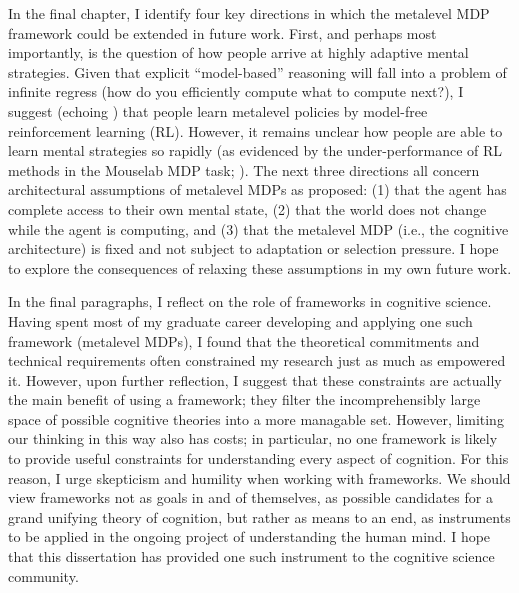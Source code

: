 \documentclass[11pt,a4paperpaper,]{article}
\begin{document}
In the final chapter, I identify four key directions in which the metalevel MDP framework could be extended in future work. First, and perhaps most importantly, is the question of how people arrive at highly adaptive mental strategies. Given that explicit ``model-based'' reasoning will fall into a problem of infinite regress (how do you efficiently compute what to compute next?), I suggest (echoing \citealp{lieder2017strategy}) that people learn metalevel policies by model-free reinforcement learning (RL). However, it remains unclear how people are able to learn mental strategies so rapidly (as evidenced by the under-performance of RL methods in the Mouselab MDP task; \citealp{jain2019how}). The next three directions all concern architectural assumptions of metalevel MDPs as proposed: (1) that the agent has complete access to their own mental state, (2) that the world does not change while the agent is computing, and (3) that the metalevel MDP (i.e., the cognitive architecture) is fixed and not subject to adaptation or selection pressure. I hope to explore the consequences of relaxing these assumptions in my own future work.

In the final paragraphs, I reflect on the role of frameworks in cognitive science. Having spent most of my graduate career developing and applying one such framework (metalevel MDPs), I found that the theoretical commitments and technical requirements often constrained my research just as much as empowered it. However, upon further reflection, I suggest that these constraints are actually the main benefit of using a framework; they filter the incomprehensibly large space of possible cognitive theories into a more managable set. However, limiting our thinking in this way also has costs; in particular, no one framework is likely to provide useful constraints for understanding every aspect of cognition. For this reason, I urge skepticism and humility when working with frameworks. We should view frameworks not as goals in and of themselves, as possible candidates for a grand unifying theory of cognition, but rather as means to an end, as instruments to be applied in the ongoing project of understanding the human mind. I hope that this dissertation has provided one such instrument to the cognitive science community.




\pagebreak

\renewenvironment{APACrefURL}[1][]{}{}
\renewcommand{\url}[1]{}
\renewenvironment{APACrefDOI}[1][]{}{}
\renewcommand{\doi}[1]{}


\end{document}
